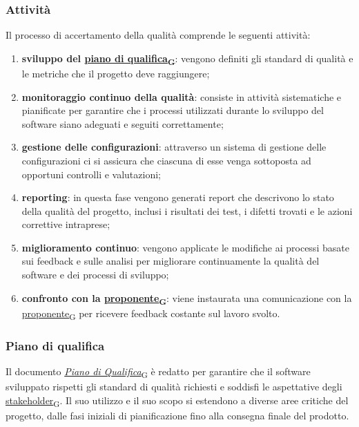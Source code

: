 \subsubsection{Attività}
Il processo di accertamento della qualità comprende le seguenti attività:
\begin{enumerate}
	\item \textbf{sviluppo del \href{https://7last.github.io/docs/rtb/documentazione-interna/glossario\#piano-di-qualifica}{piano di qualifica\textsubscript{G}}}: vengono definiti gli standard di qualità e le metriche che il progetto deve raggiungere;
	\item \textbf{monitoraggio continuo della qualità}: consiste in attività sistematiche e pianificate per garantire che i processi utilizzati durante lo sviluppo del software siano adeguati e seguiti correttamente;
	\item \textbf{gestione delle configurazioni}: attraverso un sistema di gestione delle configurazioni ci si assicura che ciascuna di esse venga sottoposta ad opportuni controlli e valutazioni;
	\item \textbf{reporting}: in questa fase vengono generati report che descrivono lo stato della qualità del progetto, inclusi i risultati dei test, i difetti trovati e le azioni correttive intraprese;
	\item \textbf{miglioramento continuo}: vengono applicate le modifiche ai processi basate sui feedback e sulle analisi per migliorare continuamente la qualità del software e dei processi di sviluppo;
	\item \textbf{confronto con la \href{https://7last.github.io/docs/rtb/documentazione-interna/glossario\#proponente}{proponente\textsubscript{G}}}: viene instaurata una comunicazione con la \href{https://7last.github.io/docs/rtb/documentazione-interna/glossario\#proponente}{proponente\textsubscript{G}} per ricevere feedback costante sul lavoro svolto.
\end{enumerate}

\subsubsection{Piano di qualifica}
Il documento \href{https://7last.github.io/docs/rtb/documentazione-interna/glossario\#piano-di-qualifica}{\textit{Piano di Qualifica}\textsubscript{G}} è redatto per garantire che il software sviluppato rispetti gli standard di qualità richiesti e soddisfi le aspettative degli \href{https://7last.github.io/docs/rtb/documentazione-interna/glossario\#stakeholder}{stakeholder\textsubscript{G}}. Il suo utilizzo e il suo scopo si estendono a diverse aree critiche del progetto, dalle fasi iniziali di pianificazione fino alla consegna finale del prodotto.

